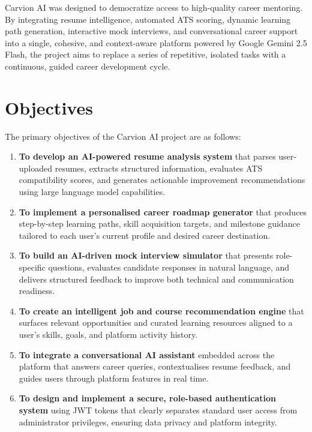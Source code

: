 \documentclass[12pt]{article}
\begin{document}
Carvion AI was designed to democratize access to high-quality career mentoring. By integrating resume intelligence, automated ATS scoring, dynamic learning path generation, interactive mock interviews, and conversational career support into a single, cohesive, and context-aware platform powered by Google Gemini 2.5 Flash, the project aims to replace a series of repetitive, isolated tasks with a continuous, guided career development cycle.

\clearpage
\section{Objectives}

The primary objectives of the Carvion AI project are as follows:

\begin{enumerate}
  \item \textbf{To develop an AI-powered resume analysis system} that parses user-uploaded resumes, extracts structured information, evaluates ATS compatibility scores, and generates actionable improvement recommendations using large language model capabilities.

  \item \textbf{To implement a personalised career roadmap generator} that produces step-by-step learning paths, skill acquisition targets, and milestone guidance tailored to each user's current profile and desired career destination.

  \item \textbf{To build an AI-driven mock interview simulator} that presents role-specific questions, evaluates candidate responses in natural language, and delivers structured feedback to improve both technical and communication readiness.

  \item \textbf{To create an intelligent job and course recommendation engine} that surfaces relevant opportunities and curated learning resources aligned to a user's skills, goals, and platform activity history.

  \item \textbf{To integrate a conversational AI assistant} embedded across the platform that answers career queries, contextualises resume feedback, and guides users through platform features in real time.

  \item \textbf{To design and implement a secure, role-based authentication system} using JWT tokens that clearly separates standard user access from administrator privileges, ensuring data privacy and platform integrity.


\end{enumerate}
\end{document}
